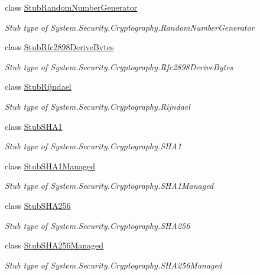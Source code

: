 \begin{DoxyCompactItemize}
class \hyperlink{class_system_1_1_security_1_1_cryptography_1_1_fakes_1_1_stub_random_number_generator}{Stub\-Random\-Number\-Generator}
\begin{DoxyCompactList}\small\item\em Stub type of System.\-Security.\-Cryptography.\-Random\-Number\-Generator\end{DoxyCompactList}\item 
class \hyperlink{class_system_1_1_security_1_1_cryptography_1_1_fakes_1_1_stub_rfc2898_derive_bytes}{Stub\-Rfc2898\-Derive\-Bytes}
\begin{DoxyCompactList}\small\item\em Stub type of System.\-Security.\-Cryptography.\-Rfc2898\-Derive\-Bytes\end{DoxyCompactList}\item 
class \hyperlink{class_system_1_1_security_1_1_cryptography_1_1_fakes_1_1_stub_rijndael}{Stub\-Rijndael}
\begin{DoxyCompactList}\small\item\em Stub type of System.\-Security.\-Cryptography.\-Rijndael\end{DoxyCompactList}\item 
class \hyperlink{class_system_1_1_security_1_1_cryptography_1_1_fakes_1_1_stub_s_h_a1}{Stub\-S\-H\-A1}
\begin{DoxyCompactList}\small\item\em Stub type of System.\-Security.\-Cryptography.\-S\-H\-A1\end{DoxyCompactList}\item 
class \hyperlink{class_system_1_1_security_1_1_cryptography_1_1_fakes_1_1_stub_s_h_a1_managed}{Stub\-S\-H\-A1\-Managed}
\begin{DoxyCompactList}\small\item\em Stub type of System.\-Security.\-Cryptography.\-S\-H\-A1\-Managed\end{DoxyCompactList}\item 
class \hyperlink{class_system_1_1_security_1_1_cryptography_1_1_fakes_1_1_stub_s_h_a256}{Stub\-S\-H\-A256}
\begin{DoxyCompactList}\small\item\em Stub type of System.\-Security.\-Cryptography.\-S\-H\-A256\end{DoxyCompactList}\item 
class \hyperlink{class_system_1_1_security_1_1_cryptography_1_1_fakes_1_1_stub_s_h_a256_managed}{Stub\-S\-H\-A256\-Managed}
\begin{DoxyCompactList}\small\item\em Stub type of System.\-Security.\-Cryptography.\-S\-H\-A256\-Managed\end{DoxyCompactList}\item 

\end{DoxyCompactItemize}
